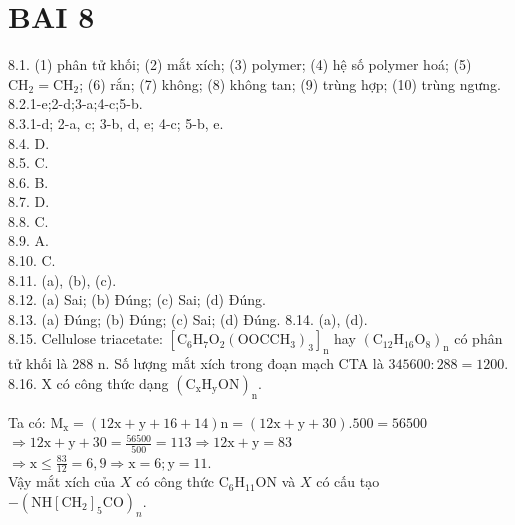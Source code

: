 \documentclass[10pt]{article}
\begin{document}
\section*{BAI 8}
8.1. (1) phân tử khối; (2) mắt xích; (3) polymer; (4) hệ số polymer hoá; (5) $\mathrm{CH}_{2}=\mathrm{CH}_{2}$; (6) rắn; (7) không; (8) không tan; (9) trùng hợp; (10) trùng ngưng.\\
8.2.1-e;2-d;3-a;4-c;5-b.\\
8.3.1-d; 2-a, c; 3-b, d, e; 4-c; 5-b, e.\\
8.4. D.\\
8.5. C.\\
8.6. B.\\
8.7. D.\\
8.8. C.\\
8.9. A.\\
8.10. C.\\
8.11. (a), (b), (c).\\
8.12. (a) Sai; (b) Đúng; (c) Sai; (d) Đúng.\\
8.13. (a) Đúng; (b) Đúng; (c) Sai; (d) Đúng. 8.14. (a), (d).\\
8.15. Cellulose triacetate: $\left[\mathrm{C}_{6} \mathrm{H}_{7} \mathrm{O}_{2}\left(\mathrm{OOCCH}_{3}\right)_{3}\right]_{\mathrm{n}}$ hay $\left(\mathrm{C}_{12} \mathrm{H}_{16} \mathrm{O}_{8}\right)_{\mathrm{n}}$ có phân tử khối là 288 n. Số lượng mắt xích trong đoạn mạch CTA là $345600: 288=1200$.\\
8.16. X có công thức dạng $\left(\mathrm{C}_{\mathrm{x}} \mathrm{H}_{\mathrm{y}} \mathrm{ON}\right)_{\mathrm{n}}$.

Ta có: $\mathrm{M}_{\mathrm{x}}=(12 \mathrm{x}+\mathrm{y}+16+14) \mathrm{n}=(12 \mathrm{x}+\mathrm{y}+30) .500=56500$\\
$\Rightarrow 12 \mathrm{x}+\mathrm{y}+30=\frac{56500}{500}=113 \Rightarrow 12 \mathrm{x}+\mathrm{y}=83$\\
$\Rightarrow \mathrm{x} \leq \frac{83}{12}=6,9 \Rightarrow \mathrm{x}=6 ; \mathrm{y}=11$.\\
Vậy mắt xích của $X$ có công thức $\mathrm{C}_{6} \mathrm{H}_{11} \mathrm{ON}$ và $X$ có cấu tạo $-\left(\mathrm{NH}\left[\mathrm{CH}_{2}\right]_{5} \mathrm{CO}\right)_{n}$.
\end{document}
